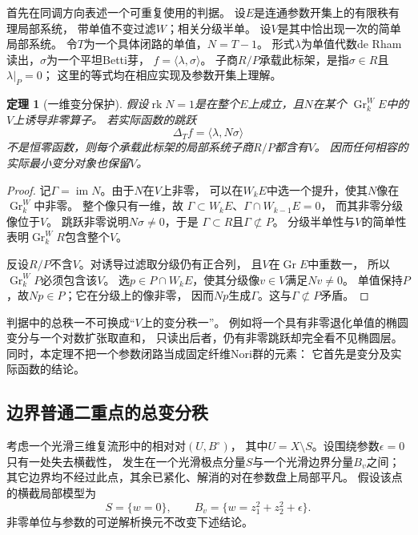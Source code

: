 \documentclass[11pt,a4paper]{ctexart}
\theoremstyle{cnplain}\newtheorem{theorem}{定理}[section]
\theoremstyle{definition}\newtheorem{definition}[theorem]{定义}
\theoremstyle{remark}\newtheorem{remark}[theorem]{注}
\newcommand{\rk}{\operatorname{rk}}\newcommand{\im}{\operatorname{im}}
\begin{document}
首先在同调方向表述一个可重复使用的判据。
设$E$是连通参数开集上的有限秩有理局部系统，
带单值不变过滤$W$；相关分级半单。
设$V$是其中恰出现一次的简单局部系统。
令$T$为一个具体闭路的单值，$N=T-1$。
形式$\lambda$为单值代数de Rham读出，$\sigma$为一个平坦Betti芽，
$f=\langle\lambda,\sigma\rangle$。
子商$R/P$承载此标架，是指$\sigma\in R$且$\lambda|_P=0$；
这里的等式均在相应实现及参数开集上理解。

\begin{theorem}[一维变分保护]\label{thm:rankonevisibility}
假设$\rk N=1$是在整个$E$上成立，且$N$在某个
$\operatorname{Gr}^W_kE$中的$V$上诱导非零算子。
若实际函数的跳跃
\[
 \Delta_T f=\langle\lambda,N\sigma\rangle
\]
不是恒零函数，则每个承载此标架的局部系统子商$R/P$都含有$V$。
因而任何相容的实际最小变分对象也保留$V$。
\end{theorem}
\begin{proof}
记$\Gamma=\im N$。由于$N$在$V$上非零，
可以在$W_kE$中选一个提升，使其$N$像在$\operatorname{Gr}_k^W$中非零。
整个像只有一维，故
$\Gamma\subset W_kE$、$\Gamma\cap W_{k-1}E=0$，
而其非零分级像位于$V$。
跳跃非零说明$N\sigma\ne0$，于是
$\Gamma\subset R$且$\Gamma\not\subset P$。
分级半单性与$V$的简单性表明$\operatorname{Gr}_k^WR$包含整个$V$。

反设$R/P$不含$V$。对诱导过滤取分级仍有正合列，
且$V$在$\operatorname{Gr}E$中重数一，
所以$\operatorname{Gr}_k^WP$必须包含该$V$。
选$p\in P\cap W_kE$，使其分级像$v\in V$满足$Nv\ne0$。
单值保持$P$，故$Np\in P$；它在分级上的像非零，
因而$Np$生成$\Gamma$。这与$\Gamma\not\subset P$矛盾。
\end{proof}

判据中的总秩一不可换成“$V$上的变分秩一”。
例如将一个具有非零退化单值的椭圆变分与一个对数扩张取直和，
只读出后者，仍有非零跳跃却完全看不见椭圆层。
同时，本定理不把一个参数闭路当成固定纤维Nori群的元素：
它首先是变分及实际函数的结论。

\subsection{边界普通二重点的总变分秩}
考虑一个光滑三维复流形中的相对对$(U,B^\circ)$，
其中$U=X\setminus S$。设围绕参数$\epsilon=0$只有一处失去横截性，
发生在一个光滑极点分量$S$与一个光滑边界分量$B_v$之间；
其它边界均不经过此点，其余已紧化、解消的对在参数盘上局部平凡。
假设该点的横截局部模型为
\begin{equation}\label{eq:boundarypinchmodel}
 S=\{w=0\},\qquad
 B_v=\{w=z_1^2+z_2^2+\epsilon\}.
\end{equation}
非零单位与参数的可逆解析换元不改变下述结论。
\end{document}
